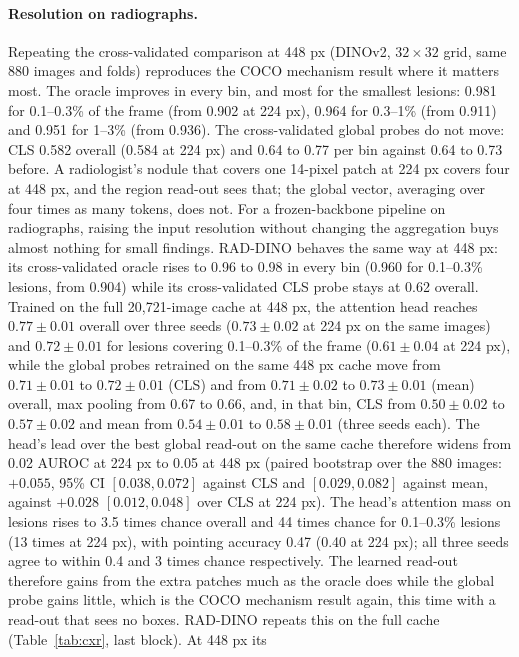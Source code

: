 \documentclass[10pt,letterpaper,twocolumn]{article}
\begin{document}
\paragraph{Resolution on radiographs.}
Repeating the cross-validated comparison at 448 px (DINOv2, $32\times32$ grid, same 880
images and folds) reproduces the COCO mechanism result where it matters most. The oracle
improves in every bin, and most for the smallest lesions: 0.981 for 0.1--0.3\% of the frame
(from 0.902 at 224 px), 0.964 for 0.3--1\% (from 0.911) and 0.951 for 1--3\% (from 0.936). The
cross-validated global probes do not move: CLS 0.582 overall (0.584 at 224 px) and 0.64 to
0.77 per bin against 0.64 to 0.73 before. A radiologist's nodule that covers one 14-pixel
patch at 224 px covers four at 448 px, and the region read-out sees that; the global vector,
averaging over four times as many tokens, does not. For a frozen-backbone pipeline on
radiographs, raising the input resolution without changing the aggregation buys almost nothing for
small findings. RAD-DINO behaves the same way at 448 px: its cross-validated oracle rises to
0.96 to 0.98 in every bin (0.960 for 0.1--0.3\% lesions, from 0.904) while its cross-validated
CLS probe stays at 0.62 overall. Trained on the full 20,721-image cache at 448 px, the attention head reaches $0.77\pm0.01$ overall over three seeds ($0.73\pm0.02$ at 224 px on the same images) and $0.72\pm0.01$ for lesions covering 0.1--0.3\% of the frame ($0.61\pm0.04$ at 224 px), while the global probes retrained on the same 448 px cache move from $0.71\pm0.01$ to $0.72\pm0.01$ (CLS) and from $0.71\pm0.02$ to $0.73\pm0.01$ (mean) overall, max pooling from 0.67 to 0.66, and, in that bin, CLS from $0.50\pm0.02$ to $0.57\pm0.02$ and mean from $0.54\pm0.01$ to $0.58\pm0.01$ (three seeds each). The head's lead over the best global read-out on the same cache therefore widens from 0.02 AUROC at 224 px to 0.05 at 448 px (paired bootstrap over the 880 images: $+0.055$, 95\% CI $[0.038, 0.072]$ against CLS and $[0.029, 0.082]$ against mean, against $+0.028$ $[0.012, 0.048]$ over CLS at 224 px). The head's attention mass on lesions rises to 3.5 times chance overall and 44 times chance for 0.1--0.3\% lesions (13 times at 224 px), with pointing accuracy 0.47 (0.40 at 224 px); all three seeds agree to within 0.4 and 3 times chance respectively. The learned read-out therefore gains from the extra patches much as the oracle does while the global probe gains little, which is the COCO mechanism result again, this time with a read-out that sees no boxes. RAD-DINO repeats this on the full cache (Table~\ref{tab:cxr}, last block). At 448 px its
\end{document}
